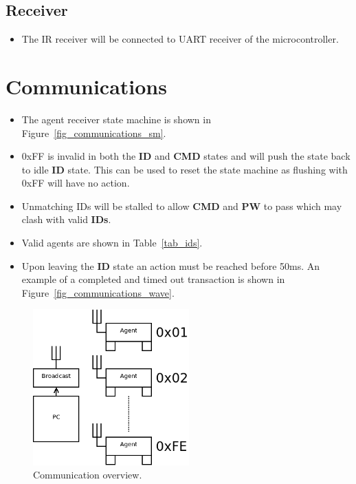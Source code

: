 \documentclass[a4paper]{article}
\begin{document}
   \subsection{Receiver}
      \begin{itemize}
         \item The IR receiver will be connected to UART receiver of the microcontroller. 
      \end{itemize}


\section{Communications}
\begin{itemize}
   \item    The agent receiver state machine is shown in Figure~\ref{fig_communications_sm}.
   \item    0xFF is invalid in both the \textbf{ID} and \textbf{CMD} states and will 
            push the state back to idle \textbf{ID} state. This can be used to reset the state machine
            as flushing with 0xFF will have no action.
   \item    Unmatching IDs will be stalled to allow \textbf{CMD} and \textbf{PW} to pass which may clash with valid \textbf{IDs}. 
   \item    Valid agents are shown in Table~\ref{tab_ids}.
   \item    Upon leaving the \textbf{ID} state an action must be reached before 50ms.
            An example of a completed and timed out transaction is shown in Figure~\ref{fig_communications_wave}.
\end{itemize}


\begin{figure}[h]
   \centering
   \label{fig_communications}
   \includegraphics[width=6cm,keepaspectratio]{communications/communications.png} 
   \caption{Communication overview.}
\end{figure}
\end{document}
